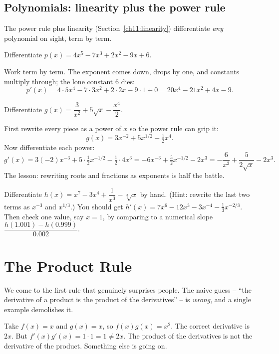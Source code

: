 \subsection{Polynomials: linearity plus the power rule}

The power rule plus linearity (Section~\ref{ch11:linearity}) differentiate \emph{any}
polynomial on sight, term by term.

\begin{example}[A polynomial]\label{ch11:ex-poly}
Differentiate $p(x) = 4x^5 - 7x^3 + 2x^2 - 9x + 6$.

Work term by term. The exponent comes down, drops by one, and constants multiply through;
the lone constant $6$ dies:
\[
  p'(x) = 4\cdot 5x^4 - 7\cdot 3x^2 + 2\cdot 2x - 9\cdot 1 + 0
        = 20x^4 - 21x^2 + 4x - 9.
\]
\end{example}

\begin{example}\label{ch11:ex-rewrite}
Differentiate $g(x) = \dfrac{3}{x^2} + 5\sqrt{x} - \dfrac{x^4}{2}$.

First rewrite every piece as a power of $x$ so the power rule can grip it:
\[
  g(x) = 3x^{-2} + 5x^{1/2} - \tfrac12 x^4 .
\]
Now differentiate each power:
\[
  g'(x) = 3(-2)x^{-3} + 5\cdot\tfrac12 x^{-1/2} - \tfrac12\cdot 4x^3
        = -6x^{-3} + \tfrac{5}{2}x^{-1/2} - 2x^3
        = -\frac{6}{x^3} + \frac{5}{2\sqrt{x}} - 2x^3 .
\]
The lesson: rewriting roots and fractions as exponents is half the battle.
\end{example}

\begin{labbox}
Differentiate $h(x) = x^7 - 3x^4 + \dfrac{1}{x^3} - \sqrt[3]{x}$ by hand. (Hint: rewrite
the last two terms as $x^{-3}$ and $x^{1/3}$.) You should get
$h'(x) = 7x^6 - 12x^3 - 3x^{-4} - \tfrac13 x^{-2/3}$. Then check one value, say
$x=1$, by comparing to a numerical slope $\dfrac{h(1.001)-h(0.999)}{0.002}$.
\end{labbox}

\section{The Product Rule}
\label{ch11:product-rule}

We come to the first rule that genuinely surprises people. The naive guess --
``the derivative of a product is the product of the derivatives'' -- is \emph{wrong}, and
a single example demolishes it.

\begin{trapbox}
Take $f(x)=x$ and $g(x)=x$, so $f(x)g(x)=x^2$. The correct derivative is $2x$. But
$f'(x)g'(x) = 1\cdot 1 = 1 \ne 2x$. The product of the derivatives is not the derivative
of the product. Something else is going on.
\end{trapbox}

